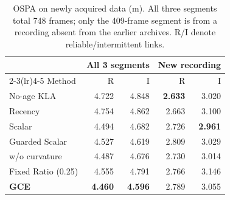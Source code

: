 \begin{table}[t]
\centering\small
\caption{OSPA on newly acquired data (m). All three segments total 748 frames; only the 409-frame segment is from a recording absent from the earlier archives. R/I denote reliable/intermittent links.}
\label{tab:newdata}
\setlength{\tabcolsep}{3pt}
\begin{tabular*}{\columnwidth}{@{\extracolsep{\fill}}lrrrr@{}}
\toprule
& \multicolumn{2}{c}{All 3 segments} & \multicolumn{2}{c}{New recording} \\
\cmidrule(lr){2-3}\cmidrule(lr){4-5}
Method & R & I & R & I \\
\midrule
No-age KLA & 4.722 & 4.848 & \textbf{2.633} & 3.020 \\
Recency & 4.754 & 4.862 & 2.663 & 3.100 \\
Scalar & 4.494 & 4.682 & 2.726 & \textbf{2.961} \\
Guarded Scalar & 4.527 & 4.619 & 2.809 & 3.029 \\
w/o curvature & 4.487 & 4.676 & 2.730 & 3.014 \\
Fixed Ratio (0.25) & 4.555 & 4.791 & 2.766 & 3.146 \\
\midrule
\textbf{GCE} & \textbf{4.460} & \textbf{4.596} & 2.789 & 3.055 \\
\bottomrule
\end{tabular*}
\end{table}
